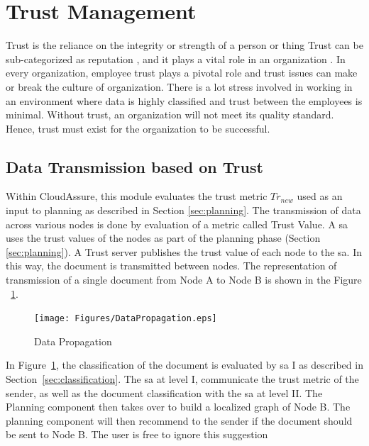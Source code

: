 \section{Trust Management}
\label{sec:trust-management}
Trust is the reliance on the integrity or strength of a person or thing
\autocite{Dictionary2013} Trust can be sub-categorized as reputation
, and it plays a vital role in an organization \autocite{Liu2006}. In every organization, employee trust plays
a pivotal role and trust issues can make or break the culture of organization. There is a
lot stress involved in working in an environment where data is highly classified and trust
between the employees is minimal. Without trust, an organization will not meet its
quality standard. Hence, trust must exist for the organization to be successful.

\subsection{Data Transmission based on Trust}
Within CloudAssure, this module evaluates the trust metric \( Tr_{new} \) used
as an input to planning as described in Section \ref{sec:planning}. The transmission of data across various
nodes is done by evaluation of a metric called Trust Value. A \gls{sa} 
uses the trust values of the nodes as part of the planning phase (Section
\ref{sec:planning}). A Trust server publishes the trust value of each node to
the \gls{sa}. In this way, the document is transmitted between
nodes. The representation of transmission of a single document from Node A to Node B is
shown in the Figure ~\ref{fig:DataTransmission}.
\begin{figure}[h!]
    \begin{center}
        \texttt{[image: Figures/DataPropagation.eps]}
        \caption{Data Propagation}
        \label{fig:DataTransmission}
    \end{center}
\end{figure}


In Figure~\ref{fig:DataTransmission}, the classification of the document
is evaluated by \gls{sa} I as described in Section~\ref{sec:classification}. 
The \gls{sa} at level I, communicate the trust metric of the sender, as well as
the document classification with the \gls{sa} at level II. The Planning
component then takes over to build a localized graph of Node B. The planning
component will then recommend to the sender if the document should be sent to
Node B. The user is free to ignore this suggestion


